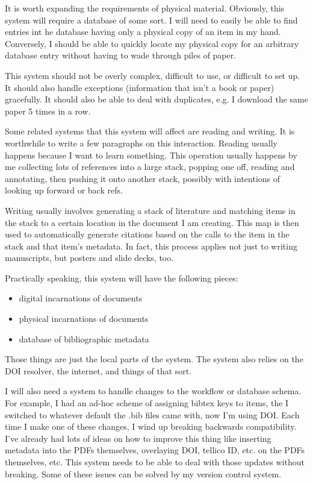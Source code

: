 \documentclass[letterpaper,12pt]{article}
\begin{document}
It is worth expanding the requirements of physical material. Obviously, this system will require a database of some sort. I will need to easily be able to find entries int he database having only a physical copy of an item in my hand. Conversely, I should be able to quickly locate my physical copy for an arbitrary database entry without having to wade through piles of paper.

This system should not be overly complex, difficult to use, or difficult to set up. It should also handle exceptions (information that isn't a book or paper) gracefully. It should also be able to deal with duplicates, e.g. I download the same paper 5 times in a row.

Some related systems that this system will affect are reading and writing. It is worthwhile to write a few paragraphs on this interaction. Reading usually happens because I want to learn something. This operation usually happens by me collecting lots of references into a large stack, popping one off, reading and annotating, then pushing it onto another stack, possibly with intentions of looking up forward or back refs.

Writing usually involves generating a stack of literature and matching items in the stack to a certain location in the document I am creating. This map is then used to automatically generate citations based on the calls to the item in the stack and that item's metadata. In fact, this process applies not just to writing manuscripts, but posters and slide decks, too.

Practically speaking, this system will have the following pieces:

\begin{itemize}
\item digital incarnations of documents
\item physical incarnations of documents
\item database of bibliographic metadata
\end{itemize}

Those things are just the local parts of the system. The system also relies on the DOI resolver, the internet, and things of that sort.

I will also need a system to handle changes to the workflow or database schema. For example, I had an ad-hoc scheme of assigning bibtex keys to items, the I switched to whatever default the .bib files came with, now I'm using DOI. Each time I make one of these changes, I wind up breaking backwards compatibility. I've already had lots of ideas on how to improve this thing like inserting metadata into the PDFs themselves, overlaying DOI, tellico ID, etc. on the PDFs themselves, etc. This system needs to be able to deal with those updates without breaking. Some of these issues can be solved by my version control system.
\end{document}
